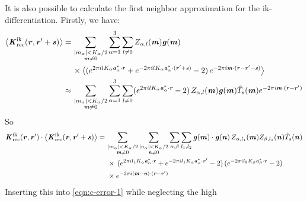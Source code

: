 \documentclass[journal=jacsat,manuscript=article]{achemso}
\newcommand{\redc}[1]{{\color{black} #1}}
\renewcommand{\v}[1]{\textbf{\textit{#1}}}
\begin{document}
It is also possible to calculate the first neighbor approximation for the
ik-differentiation. Firstly, we have:
\begin{align}\nonumber
  \big\langle
  \v K^{\textrm{ik}}_{\textrm{rec}}(\v r, \v r'+\v s)
  \big\rangle
  = \,&
  \sum_{
    \begin{subarray}{c}
      \vert m_{\alpha}\vert < K_\alpha/2\\
      \v m\neq 0
    \end{subarray}}
  \sum_{\alpha=1}^3\sum_{l\neq 0}
  Z_{\alpha,l}(\v m)
  \v g(\v m) \\ \nonumber
  \,&
  \times
  \big\langle
  (
  e^{2\pi i l K_\alpha\v a^\ast_\alpha\cdot \v r} +
  e^{-2\pi i l K_\alpha\v a^\ast_\alpha\cdot (\v r' + \v s)}
  - 2
  )\,
  e^{-2\pi i\v m\cdot(\v r-\v r' -\v s)}
  \big\rangle \\
  \approx\,&
  \sum_{
    \begin{subarray}{c}
      \vert m_{\alpha}\vert < K_\alpha/2\\
      \v m\neq 0
    \end{subarray}}
  \sum_{\alpha=1}^3\sum_{l\neq 0}
  (
  e^{2\pi i l K_\alpha\v a^\ast_\alpha\cdot \v r} 
  - 2
  )\,
  Z_{\alpha,l}(\v m)
  \v g(\v m)
  \hat T_s(\v m)
  e^{-2\pi i\v m\cdot(\v r-\v r')}  
\end{align}
So
\begin{align}\nonumber
  \v K^{\textrm{ik}}_{\textrm{rec}}(\v r,\v r')\cdot
  \big\langle
  \v K^{\textrm{ik}}_{\textrm{rec}}(\v r, \v r'+\v s)
  \big\rangle
  =\,&
  \sum_{
    \begin{subarray}{c}
      \vert m_{\alpha}\vert < K_\alpha/2\\
      \v m\neq 0
    \end{subarray}}
  \sum_{
    \begin{subarray}{c}
      \vert n_{\alpha}\vert < K_\alpha/2\\
      \v n\neq 0
    \end{subarray}}
  \sum_{\alpha,\beta}
  \sum_{l_1,l_2}
  \v g(\v m)\cdot\v g(\v n)\,
  Z_{\alpha,l_1}(\v m)Z_{\beta,l_2}(\v n)\hat T_s(\v n)
  \\\nonumber
  &\,
  \times
  \,(
  e^{2\pi i l_1 K_\alpha\v a^\ast_\alpha\cdot \v r} +
  e^{-2\pi i l_1 K_\alpha\v a^\ast_\alpha\cdot \v r'}
  - 2
  )
  \,(
  e^{-2\pi i l_2 K_\beta\v a^\ast_\beta\cdot \v r}
  - 2
  )\\
  &\,
  \times
  e^{-2\pi i(\v m-\v n)\cdot(\v r-\v r')}
\end{align}
Inserting \redc{this} into \ref{eqn:c-error-1} \redc{while neglecting} the high
\end{document}
